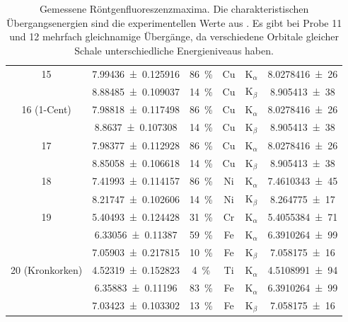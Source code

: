 \documentclass[
	a4paper,
	12pt,
	pagesize,
	ngerman
]{scrartcl}
\begin{document}
\begin{table}[H]
{\begin{tabular}{ c | c | c || c | c | c }
			15
			& \SI{7.99436+-0.125916}{} &\SI{86}{\%}& Cu & $\text{K}_\alpha$ &  \SI{8,0278416(26)}{} \\
			& \SI{8.88485+-0.109037}{} &\SI{14}{\%}&  Cu &  $\text{K}_\beta$ & \SI{8,905413(38)}{} \\
			\hline

			16 (1-Cent)
			& \SI{7.98818+-0.117498}{} &\SI{86}{\%}& Cu & $\text{K}_\alpha$ &  \SI{8,0278416(26)}{} \\
			& \SI{8.8637+-0.107308}{} &\SI{14}{\%}& Cu &  $\text{K}_\beta$ & \SI{8,905413(38)}{} \\
			\hline

			17
			& \SI{7.98377+-0.112928}{} &\SI{86}{\%}& Cu & $\text{K}_\alpha$ & \SI{8,0278416(26)}{} \\
			& \SI{8.85058+-0.106618}{} &\SI{14}{\%}& Cu & $\text{K}_\beta$ & \SI{8,905413(38)}{} \\
			\hline

			18
			& \SI{7.41993+-0.114157}{} &\SI{86}{\%}& Ni & $\text{K}_\alpha$ & \SI{7,4610343(45)}{} \\
			& \SI{8.21747+-0.102606}{} &\SI{14}{\%}& Ni & $\text{K}_\beta$ &   \SI{8,264775(17)}{} \\
			\hline

			19
			& \SI{5.40493+-0.124428}{} &\SI{31}{\%}& Cr & $\text{K}_\alpha$ & \SI{5,4055384(71)}{} \\
			& \SI{6.33056+-0.11387}{} &\SI{59}{\%}& Fe & $\text{K}_\alpha$ & \SI{ 6,3910264(99)}{} \\
			& \SI{7.05903+-0.217815}{} &\SI{10}{\%}& Fe &  $\text{K}_\beta $ & \SI{7,058175(16)}{} \\
			\hline

			20 (Kronkorken)
			& \SI{4.52319+-0.152823}{} &\SI{4}{\%}& Ti & $\text{K}_\alpha $ &  \SI{4. 5108991(94)}{} \\
			& \SI{6.35883+-0.11196}{} &\SI{83}{\%}& Fe & $\text{K}_\alpha $ &  \SI{6,3910264(99)}{} \\
			& \SI{7.03423+-0.103302}{} &\SI{13}{\%}& Fe & $\text{K}_\beta $ &  \SI{7,058175(16)}{} \\
			\hline
		\end{tabular}
		}
		\caption{Gemessene Röntgenfluoreszenzmaxima. Die charakteristischen Übergangsenergien sind die experimentellen Werte aus \cite{XRAYDB}.
		Es gibt bei Probe 11 und 12 mehrfach gleichnamige Übergänge, da verschiedene Orbitale gleicher Schale unterschiedliche Energieniveaus haben.}
		\label{tb_peaks_unknown}

	\end{table}
\end{document}
